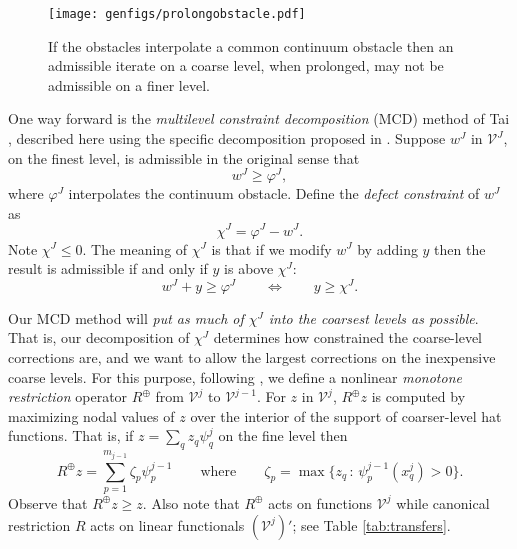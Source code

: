 \documentclass[letterpaper,final,12pt,reqno]{amsart}
\theoremstyle{claim}
\newcommand{\mR}{R^{\bm{\oplus}}}
\numberwithin{equation}{section}
\numberwithin{figure}{section}
\numberwithin{table}{section}
\numberwithin{theorem}{section}
\begin{document}
\begin{figure}
\qquad \texttt{[image: genfigs/prolongobstacle.pdf]}
\caption{If the obstacles interpolate a common continuum obstacle then an admissible iterate on a coarse level, when prolonged, may not be admissible on a finer level.}
\label{fig:prolongobstacle}
\end{figure}

One way forward is the \emph{multilevel constraint decomposition} (MCD) method of Tai \cite{Tai2003}, described here using the specific decomposition proposed in \cite{GraeserKornhuber2009}.  Suppose $w^J$ in $\mathcal{V}^J$, on the finest level, is admissible in the original sense that
\begin{equation}
  w^J \ge \varphi^J, \label{eq:fineadmissibleiterate}
\end{equation}
where $\varphi^J$ interpolates the continuum obstacle.  Define the \emph{defect constraint} \cite{GraeserKornhuber2009} of $w^J$ as
\begin{equation}
  \chi^J = \varphi^J - w^J.  \label{eq:defectconstraint}
\end{equation}
Note $\chi^J \le 0$.  The meaning of $\chi^J$ is that if we modify $w^J$ by adding $y$ then the result is admissible if and only if $y$ is above $\chi^J$:
\begin{equation}
  w^J + y \ge \varphi^J  \qquad \iff \qquad y \ge \chi^J.  \label{eq:defectmeaning}
\end{equation}

Our MCD method will \emph{put as much of $\chi^J$ into the coarsest levels as possible}.  That is, our decomposition of $\chi^J$ determines how constrained the coarse-level corrections are, and we want to allow the largest corrections on the inexpensive coarse levels.  For this purpose, following \cite[equation (4.22)]{GraeserKornhuber2009}, we define a nonlinear \emph{monotone restriction} operator $\mR$ from $\mathcal{V}^j$ to $\mathcal{V}^{j-1}$.  For $z$ in $\mathcal{V}^j$, $\mR z$ is computed by maximizing nodal values of $z$ over the interior of the support of coarser-level hat functions.  That is, if $z = \sum_q z_q \psi_q^j$ on the fine level then
\begin{equation}
  \mR z = \sum_{p=1}^{m_{j-1}} \zeta_p \psi_p^{j-1} \qquad \text{where} \qquad \zeta_p = \max \{z_q \,:\, \psi_p^{j-1}(x_q^j) > 0\}.  \label{eq:monotonerestriction}
\end{equation}
Observe that $\mR z \ge z$.  Also note that $\mR$ acts on functions $\mathcal{V}^j$ while canonical restriction $R$ acts on linear functionals $(\mathcal{V}^j)'$; see Table \ref{tab:transfers}.
\end{document}
